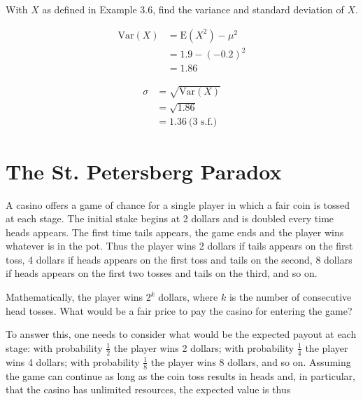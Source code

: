 \documentclass[11pt,a4paper]{book}
\begin{document}
\begin{example}

With $X$ as defined in \textsf{Example 3.6}, find the variance and standard
deviation of $X$.

\Solution

\begin{align*}
\text{Var}\left(X\right) & =\text{E}\left(X^{2}\right)-\mu^{2}\\
 & =1.9-\left(-0.2\right)^{2}\\
 & =1.86
\end{align*}

\begin{align*}
\sigma & =\sqrt{\text{Var}\left(X\right)}\\
 & =\sqrt{1.86}\\
 & =1.36\:\text{(3 s.f.)}
\end{align*}

\end{example}

\newpage

\section{The St. Petersberg Paradox}

A casino offers a game of chance for a single player in which a fair
coin is tossed at each stage. The initial stake begins at 2 dollars
and is doubled every time heads appears. The first time tails appears,
the game ends and the player wins whatever is in the pot. Thus the
player wins 2 dollars if tails appears on the first toss, 4 dollars
if heads appears on the first toss and tails on the second, 8 dollars
if heads appears on the first two tosses and tails on the third, and
so on.

Mathematically, the player wins $2^{k}$ dollars, where $k$ is the
number of consecutive head tosses. What would be a fair price to pay
the casino for entering the game?

To answer this, one needs to consider what would be the expected payout
at each stage: with probability ${\displaystyle \frac{1}{2}}$ the
player wins 2 dollars; with probability ${\displaystyle \frac{1}{4}}$
the player wins 4 dollars; with probability ${\displaystyle \frac{1}{8}}$
the player wins 8 dollars, and so on. Assuming the game can continue
as long as the coin toss results in heads and, in particular, that
the casino has unlimited resources, the expected value is thus
\end{document}
